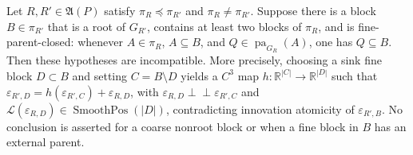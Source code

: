 Let \(R,R'\in\mathfrak A(P)\) satisfy \(\pi_R\preceq\pi_{R'}\) and \(\pi_R\neq\pi_{R'}\). Suppose there is a block \(B\in\pi_{R'}\) that is a root of \(G_{R'}\), contains at least two blocks of \(\pi_R\), and is fine-parent-closed: whenever \(A\in\pi_R\), \(A\subseteq B\), and \(Q\in\operatorname{pa}_{G_R}(A)\), one has \(Q\subseteq B\). Then these hypotheses are incompatible. More precisely, choosing a sink fine block \(D\subset B\) and setting \(C=B\setminus D\) yields a \(C^3\) map \(h:\mathbb R^{|C|}\to\mathbb R^{|D|}\) such that \(\varepsilon_{R',D}=h(\varepsilon_{R',C})+\varepsilon_{R,D}\), with \(\varepsilon_{R,D}\perp\!\!\!\perp\varepsilon_{R',C}\) and \(\mathcal L(\varepsilon_{R,D})\in\operatorname{SmoothPos}(|D|)\), contradicting innovation atomicity of \(\varepsilon_{R',B}\). No conclusion is asserted for a coarse nonroot block or when a fine block in \(B\) has an external parent.